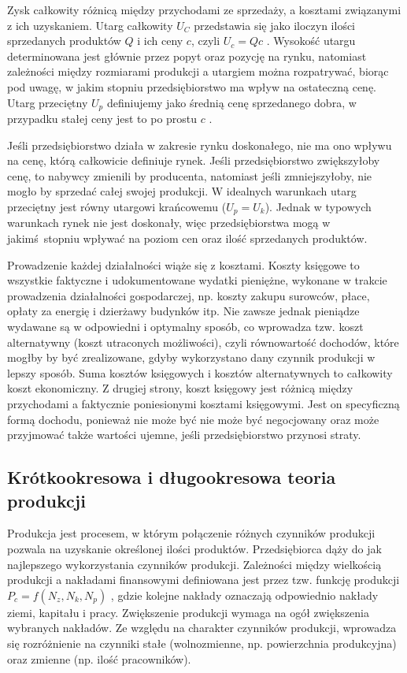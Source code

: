 \documentclass[12pt]{extarticle}
\begin{document}
Zysk całkowity różnicą między przychodami ze sprzedaży, a kosztami związanymi z ich uzyskaniem. Utarg całkowity $ U_C $ przedstawia się jako iloczyn ilości sprzedanych produktów $ Q $ i ich ceny $ c $, czyli $ U_c = Qc $ . Wysokość utargu determinowana jest głównie przez popyt oraz pozycję na rynku, natomiast zależności między rozmiarami produkcji a utargiem można rozpatrywać, biorąc pod uwagę, w jakim stopniu przedsiębiorstwo ma wpływ na ostateczną cenę. Utarg przeciętny $ U_p $ definiujemy jako średnią cenę sprzedanego dobra, w przypadku stałej ceny jest to po prostu $ c $ .

Jeśli przedsiębiorstwo działa w zakresie rynku doskonałego, nie ma ono wpływu na cenę, którą całkowicie definiuje rynek. Jeśli przedsiębiorstwo zwiększyłoby cenę, to nabywcy zmienili by producenta, natomiast jeśli zmniejszyłoby, nie mogło by sprzedać całej swojej produkcji. W idealnych warunkach utarg przeciętny jest równy utargowi krańcowemu ($ U_p = U_k $). Jednak w typowych warunkach rynek nie jest doskonały, więc przedsiębiorstwa mogą w jakimś stopniu wpływać na poziom cen oraz ilość sprzedanych produktów.

Prowadzenie każdej działalności wiąże się z kosztami. Koszty księgowe to wszystkie faktyczne i udokumentowane wydatki pieniężne, wykonane w trakcie prowadzenia działalności gospodarczej, np. koszty zakupu surowców, płace, opłaty za energię i dzierżawy budynków itp. Nie zawsze jednak pieniądze wydawane są w odpowiedni i optymalny sposób, co wprowadza tzw. koszt alternatywny (koszt utraconych możliwości), czyli równowartość dochodów, które mogłby by być zrealizowane, gdyby wykorzystano dany czynnik produkcji w lepszy sposób. Suma kosztów księgowych i kosztów alternatywnych to całkowity koszt ekonomiczny. Z drugiej strony, koszt księgowy jest różnicą między przychodami a faktycznie poniesionymi kosztami księgowymi. Jest on specyficzną formą dochodu, ponieważ nie może być nie może być negocjowany oraz może przyjmować także wartości ujemne, jeśli przedsiębiorstwo przynosi straty.

\subsection{Krótkookresowa i długookresowa teoria produkcji}

Produkcja jest procesem, w którym połączenie różnych czynników produkcji pozwala na uzyskanie określonej ilości produktów. Przedsiębiorca dąży do jak najlepszego wykorzystania czynników produkcji. Zależności między wielkością produkcji a nakładami finansowymi definiowana jest przez tzw. funkcję produkcji $ P_c = f(N_z, N_k, N_p) $ , gdzie kolejne nakłady oznaczają odpowiednio nakłady ziemi, kapitału i pracy. Zwiększenie produkcji wymaga na ogół zwiększenia wybranych nakładów. Ze względu na charakter czynników produkcji, wprowadza się rozróżnienie na czynniki stałe (wolnozmienne, np. powierzchnia produkcyjna) oraz zmienne (np. ilość pracowników).
\end{document}
